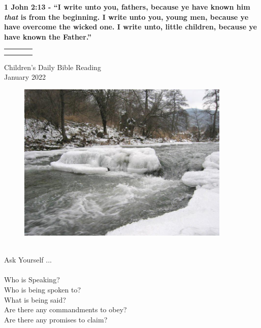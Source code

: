 \documentclass[11pt,landscape,twocolumn,letterpaper]{article}
\begin{document}
\begin{center}
\textcolor[rgb]{0.00,0.00,1.00}{\textbf{1 John 2:13 - ``I write unto you, fathers, because ye have known him \emph{that} is from the beginning.  I write unto you, young men, because ye have overcome the wicked one.  I write unto, little children, because ye have known the Father.''}}
\end{center}

\newpage
\begin{tabular}{p{0.5in}p{0.6in}p{2.3in}p{0.35in}}
  \textcolor[rgb]{0.00,0.00,1.00}{} & \textcolor[rgb]{0.00,0.00,1.00}{} & & \textcolor[rgb]{0.00,0.00,1.00}{} \\
   & \multicolumn{2}{l}{\textcolor[rgb]{1.00,0.00,0.00}{}}& \textcolor[rgb]{0.00,0.00,1.00}{}\\
\end{tabular}
\newpage
\LARGE
\begin{center}
\textcolor[rgb]{0.98,0.00,0.00}{Children's Daily Bible Reading}\\
\textcolor[rgb]{0.00,0.00,1.00}{January 2022}\\
\end{center}


\begin{figure}[htp]
    \centering
  \includegraphics[width=4.0in]{January}\\
\end{figure}

\begin{center}
\textcolor[rgb]{0.00,0.00,1.00}{\\Ask Yourself ...\\}
\textcolor[rgb]{1.00,0.00,0.00}{\\Who is Speaking?\\Who is being spoken to?\\What is being said?\\Are there
any commandments to obey?\\Are there any promises to claim?}
\end{center}
\end{document}
